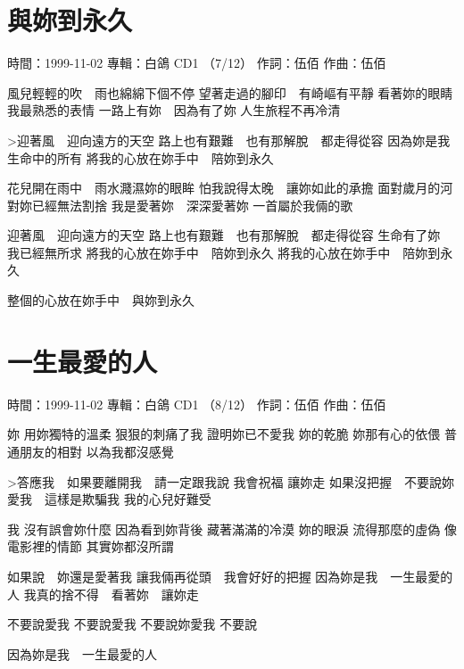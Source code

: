 \documentclass[UTF8,a4paper,oneside,twocolumn,12pt]{ctexbook}
\newcommand{\infopair}[2]{\textbullet #1：#2}
\newcommand{\zc}[1][伍佰]{\infopair{作詞}{#1}}
\newcommand{\zq}[1][伍佰]{\infopair{作曲}{#1}}
\newcommand{\zj}[1]{\infopair{專輯}{#1}}
\newcommand{\sj}[1]{\infopair{時間}{#1}}
\newenvironment{info}{\begin{flushleft}\kaishu
	}
	{\end{flushleft}\normalsize\yahei\par}
\newenvironment{lyric}{
	}
{}
\begin{document}
\section{與妳到永久}
\begin{info}
	\sj{1999-11-02}
	\zj{白鴿 CD1 （7/12）}
	\zc
	\zq
\end{info}
\begin{lyric}
	風兒輕輕的吹　雨也綿綿下個不停
	望著走過的腳印　有崎嶇有平靜
	看著妳的眼睛　我最熟悉的表情
	一路上有妳　因為有了妳
	人生旅程不再冷清

	>迎著風　迎向遠方的天空
	路上也有艱難　也有那解脫　都走得從容
	因為妳是我　生命中的所有
	將我的心放在妳手中　陪妳到永久

	花兒開在雨中　雨水濺濕妳的眼眸
	怕我說得太晚　讓妳如此的承擔
	面對歲月的河　對妳已經無法割捨
	我是愛著妳　深深愛著妳
	一首屬於我倆的歌

	迎著風　迎向遠方的天空
	路上也有艱難　也有那解脫　都走得從容
	生命有了妳　我已經無所求
	將我的心放在妳手中　陪妳到永久
	將我的心放在妳手中　陪妳到永久

	整個的心放在妳手中　與妳到永久
\end{lyric}

\section{一生最愛的人}
\begin{info}
	\sj{1999-11-02}
	\zj{白鴿 CD1 （8/12）}
	\zc
	\zq
\end{info}
\begin{lyric}
	妳
	用妳獨特的溫柔
	狠狠的刺痛了我
	證明妳已不愛我
	妳的乾脆
	妳那有心的依偎
	普通朋友的相對
	以為我都沒感覺

	>答應我　如果要離開我　請一定跟我說
	我會祝福  讓妳走
	如果沒把握　不要說妳愛我　這樣是欺騙我
	我的心兒好難受

	我
	沒有誤會妳什麼
	因為看到妳背後
	藏著滿滿的冷漠
	妳的眼淚
	流得那麼的虛偽
	像電影裡的情節
	其實妳都沒所謂

	如果說　妳還是愛著我
	讓我倆再從頭　我會好好的把握
	因為妳是我　一生最愛的人
	我真的捨不得　看著妳　讓妳走

	不要說愛我
	不要說愛我
	不要說妳愛我
	不要說

	因為妳是我　一生最愛的人
\end{lyric}
\end{document}
